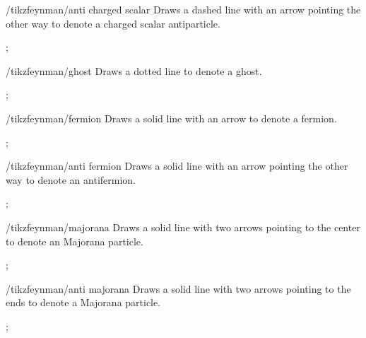\documentclass[a4paper,final]{ltxdoc}
\begin{document}
\begin{key}{/tikzfeynman/anti charged scalar}
  Draws a dashed line with an arrow pointing the other way to denote a charged
  scalar antiparticle.

\begin{codeexample}[]
;
\end{codeexample}
\end{key}

\begin{key}{/tikzfeynman/ghost}
  Draws a dotted line to denote a ghost.

\begin{codeexample}[]
;
\end{codeexample}
\end{key}


\begin{key}{/tikzfeynman/fermion}
  Draws a solid line with an arrow to denote a fermion.

\begin{codeexample}[]
;
\end{codeexample}
\end{key}

\begin{key}{/tikzfeynman/anti fermion}
  Draws a solid line with an arrow pointing the other way to denote an antifermion.

\begin{codeexample}[]
;
\end{codeexample}
\end{key}

\begin{key}{/tikzfeynman/majorana}
  Draws a solid line with two arrows pointing to the center to denote an
  Majorana particle.

\begin{codeexample}[]
;
\end{codeexample}
\end{key}

\begin{key}{/tikzfeynman/anti majorana}
  Draws a solid line with two arrows pointing to the ends to denote a Majorana
  particle.

\begin{codeexample}[]
;
\end{codeexample}
\end{key}
\end{document}

